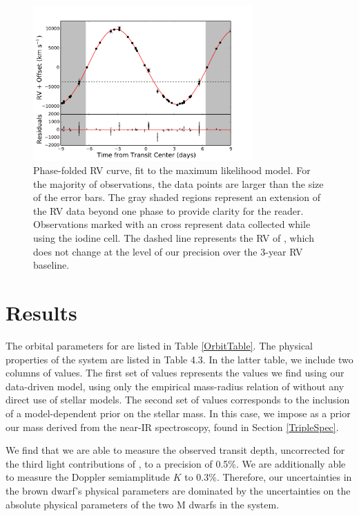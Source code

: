 \begin{figure}[htbp]
\centerline{\includegraphics[width=0.75\textwidth]{chapter4/f5.pdf}}
\caption[Phase-folded RV curve, fit to the maximum likelihood model]{Phase-folded RV curve, fit to the maximum likelihood model.
For the majority of observations, the data points are larger than the size of the error bars.
The gray shaded regions represent an extension of the RV data beyond one phase to provide clarity for the reader. 
Observations marked with an cross represent data collected while using the iodine cell.
The dashed line represents the RV of \LB{}, which does not change at the level of our precision over the 3-year RV baseline.
  }
\label{RVs-4}
\end{figure}



\section{Results}

The orbital parameters for \LC{} are listed in Table \ref{OrbitTable}.
The physical properties of the \LHS{} system are listed in Table 4.3. 
In the latter table, we include two columns of values. 
The first set of values represents the values we find using our data-driven model, using only the empirical mass-radius relation of \citet{Boyajian12} without any direct use of stellar models. 
The second set of values corresponds to the inclusion of a model-dependent prior on the stellar mass.
In this case, we impose as a prior our mass derived from the near-IR spectroscopy, found in Section {\ref{TripleSpec}}.

We find that we are able to measure the observed transit depth, uncorrected for the third light contributions of \LB, to a precision of 0.5\%.
We are additionally able to measure the Doppler semiamplitude $K$ to 0.3\%. 
Therefore, our uncertainties in the brown dwarf's physical parameters are dominated by the uncertainties on the absolute physical parameters of the two M dwarfs in the system.

